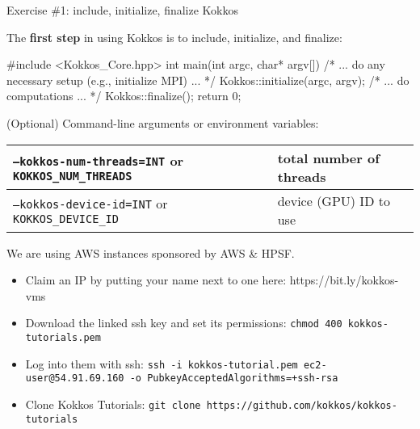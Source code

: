 
\begin{frame}[fragile]{Exercise \#1: include, initialize, finalize Kokkos}

  The \textbf{first step} in using Kokkos is to include, initialize, and finalize:

  \begin{code}
#include <Kokkos_Core.hpp>
int main(int argc, char* argv[]) {
  /* ... do any necessary setup (e.g., initialize MPI) ... */
  Kokkos::initialize(argc, argv);
  {
  /* ... do computations ... */
  }
  Kokkos::finalize();
  return 0;
}
  \end{code}

  \vspace{7pt}

  (Optional) Command-line arguments or environment variables:

  \vspace{3pt}

	\begin{tabular}{| p{} | p{} |}
    \hline
	  \texttt{--kokkos-num-threads=INT} or \texttt{KOKKOS\_NUM\_THREADS} & total number of threads \\
    \hline
	  \texttt{--kokkos-device-id=INT} or \texttt{KOKKOS\_DEVICE\_ID} & device (GPU) ID to use \\
    \hline
  \end{tabular}

\end{frame}


\begin{frame}[fragile]
We are using AWS instances sponsored by AWS \& HPSF.

\begin{itemize}
\item Claim an IP by putting your name next to one here: https://bit.ly/kokkos-vms
\item Download the linked ssh key and set its permissions: \texttt{chmod 400 kokkos-tutorials.pem}
\item Log into them with ssh: \texttt{ssh -i kokkos-tutorial.pem ec2-user@54.91.69.160 -o PubkeyAcceptedAlgorithms=+ssh-rsa}
\item Clone Kokkos Tutorials: \texttt{git clone https://github.com/kokkos/kokkos-tutorials}
\end{itemize}
\end{frame}

